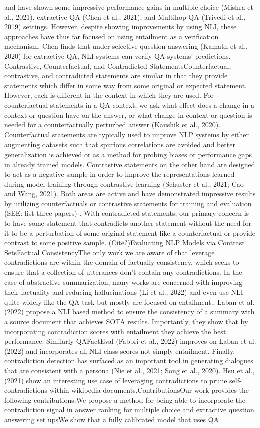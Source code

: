\documentclass{scrbook}
\begin{document}
and have shown some impressive performance gains in multiple choice (Mishra et al., 2021), extractive QA (Chen et al., 2021), and Multihop QA (Trivedi et al., 2019) settings. However, despite showing improvements by using NLI, these approaches have thus far focused on using entailment as a verification mechanism. Chen finds that under selective question answering (Kamath et al., 2020) for extractive QA, NLI systems can verify QA systems’ predictions. Contrastive, Counterfactual, and Contradicted StatementsCounterfactual, contrastive, and contradicted statements are similar in that they provide statements which differ in some way from some original or expected statement. However, each is different in the context in which they are used. For counterfactual statements in a QA context, we ask what effect does a change in a context or question have on the answer, or what change in context or question is needed for a counterfactually perturbed answer (Kaushik et al., 2020). Counterfactual statements are typically used to improve NLP systems by either augmenting datasets such that spurious correlations are avoided and better generalization is achieved or as a method for probing biases or performance gaps in already trained models. Contrastive statements on the other hand are designed to act as a negative sample in order to improve the representations learned during model training through contrastive learning (Schuster et al., 2021; Cao and Wang, 2021). Both areas are active and have demonstrated impressive results by utilizing counterfactuals or contrastive statements for training and evaluation (SEE: list three papers) . With contradicted statements, our primary concern is to have some statement that contradicts another statement without the need for it to be a perturbation of some original statement like a counterfactual or provide contrast to some positive sample. (Cite?)Evaluating NLP Models via Contrast SetsFactual ConsistencyThe only work we are aware of that leverage contradictions are within the domain of factually consistency, which seeks to ensure that a collection of utterances don't contain any contradictions. In the case of abstractive summarization, many works are concerned with improving their factuality and reducing hallucinations (Li et al., 2022) and even use NLI quite widely like the QA task but mostly are focused on entailment.. Laban et al. (2022) propose a NLI based method to ensure the consistency of a summary with a source document that achieves SOTA results. Importantly, they show that by incorporating contradiction scores with entailment they achieve the best performance. Similarly QAFactEval (Fabbri et al., 2022) improves on Laban et al. (2022) and incorporates all NLI class scores not simply entailment. Finally, contradiction detection has surfaced as an important tool in generating dialogues that are consistent with a persona (Nie et al., 2021; Song et al., 2020). Hsu et al., (2021) show an interesting use case of leveraging contradictions to prune self-contradictions within wikipedia documents.ContributionsOur work provides the following contributions:We propose a method for being able to incorporate the contradiction signal in answer ranking for multiple choice and extractive question answering set upsWe show that a fully calibrated model that uses QA 
\end{document}
